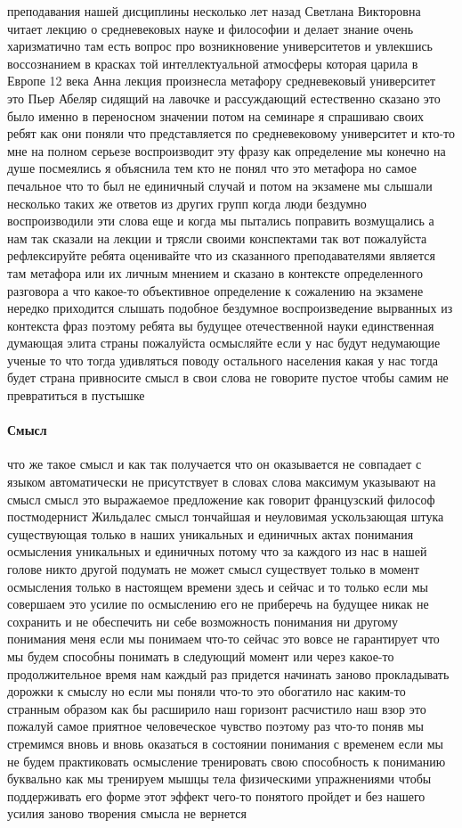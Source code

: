 преподавания нашей дисциплины несколько лет назад Светлана Викторовна читает
лекцию о средневековых науке и философии и делает знание очень харизматично там
есть вопрос про возникновение университетов и увлекшись воссознанием в красках
той интеллектуальной атмосферы которая царила в Европе 12 века Анна лекция
произнесла метафору средневековый университет это Пьер Абеляр сидящий на лавочке
и рассуждающий естественно сказано это было именно в переносном значении потом
на семинаре я спрашиваю своих ребят как они поняли что представляется по
средневековому университет и кто-то мне на полном серьезе воспроизводит эту
фразу как определение мы конечно на душе посмеялись я объяснила тем кто не понял
что это метафора но самое печальное что то был не единичный случай и потом на
экзамене мы слышали несколько таких же ответов из других групп когда люди
бездумно воспроизводили эти слова еще и когда мы пытались поправить возмущались
а нам так сказали на лекции и трясли своими конспектами так вот пожалуйста
рефлексируйте ребята оценивайте что из сказанного преподавателями является там
метафора или их личным мнением и сказано в контексте определенного разговора а
что какое-то объективное определение к сожалению на экзамене нередко приходится
слышать подобное бездумное воспроизведение вырванных из контекста фраз поэтому
ребята вы будущее отечественной науки единственная думающая элита страны
пожалуйста осмысляйте если у нас будут недумающие ученые то что тогда удивляться
поводу остального населения какая у нас тогда будет страна привносите смысл в
свои слова не говорите пустое чтобы самим не превратиться в пустышке 

\paragraph{Смысл}
что же
такое смысл и как так получается что он оказывается не совпадает с языком
автоматически не присутствует в словах слова максимум указывают на смысл смысл
это выражаемое предложение как говорит французский философ постмодернист
Жильдалес смысл тончайшая и неуловимая ускользающая штука существующая только в
наших уникальных и единичных актах понимания осмысления уникальных и единичных
потому что за каждого из нас в нашей голове никто другой подумать не может смысл
существует только в момент осмысления только в настоящем времени здесь и сейчас
и то только если мы совершаем это усилие по осмыслению его не приберечь на
будущее никак не сохранить и не обеспечить ни себе возможность понимания ни
другому понимания меня если мы понимаем что-то сейчас это вовсе не гарантирует
что мы будем способны понимать в следующий момент или через какое-то
продолжительное время нам каждый раз придется начинать заново прокладывать
дорожки к смыслу но если мы поняли что-то это обогатило нас каким-то странным
образом как бы расширило наш горизонт расчистило наш взор это пожалуй самое
приятное человеческое чувство поэтому раз что-то поняв мы стремимся вновь и
вновь оказаться в состоянии понимания с временем если мы не будем практиковать
осмысление тренировать свою способность к пониманию буквально как мы тренируем
мышцы тела физическими упражнениями чтобы поддерживать его форме этот эффект
чего-то понятого пройдет и без нашего усилия заново творения смысла не вернется

